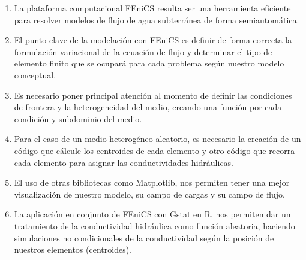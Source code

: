 \begin{enumerate}
\item La plataforma computacional FEniCS resulta ser una herramienta eficiente para resolver modelos de flujo de agua subterránea de forma semiautomática. 

\item El punto clave de la modelación con FEniCS es definir de forma correcta la formulación variacional de la ecuación de flujo y determinar el tipo de elemento finito que se ocupará para cada problema según nuestro modelo conceptual. 

\item Es necesario poner principal atención al momento de definir las condiciones de frontera y la heterogeneidad del medio, creando una función por cada condición y subdominio del medio.

\item Para el caso de un medio heterogéneo aleatorio, es necesario la creación de un código que cálcule los centroides de cada elemento y otro código que recorra cada elemento para asignar las conductividades hidráulicas.

\item El uso de otras bibliotecas como Matplotlib, nos permiten tener una mejor visualización de nuestro modelo, su campo de cargas y su campo de flujo. 

\item La aplicación en conjunto de FEniCS con Gstat en R, nos permiten dar un tratamiento de la conductividad hidráulica como función aleatoria, haciendo simulaciones no condicionales de la conductividad según la posición de nuestros elementos (centroides).  


\end{enumerate}
